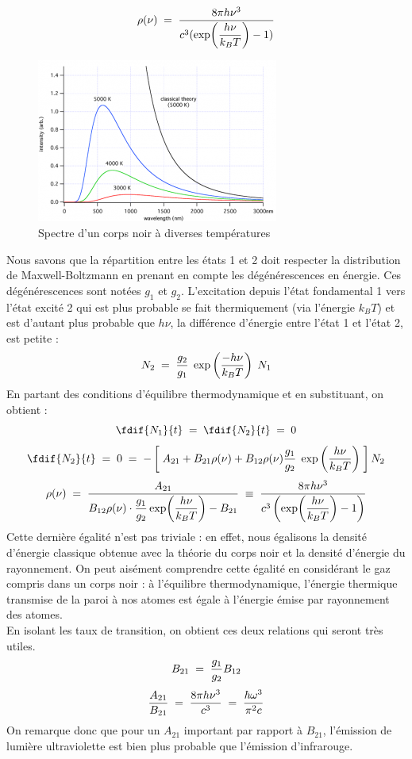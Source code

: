 \begin{equation}
    \rho(\nu) \; = \; \dfrac{8\pi h \nu^3}{c^3(\exp(\dfrac{h\nu}{k_BT})-1)}
\end{equation}
\begin{figure}[htp]
    \centering
    \includegraphics[scale=1.1]{Images2/corps_noir.png}
    \caption{Spectre d'un corps noir à diverses températures}
    \label{fig : Corps noir}
\end{figure}
Nous savons que la répartition entre les états 1 et 2 doit respecter la distribution de Maxwell-Boltzmann en prenant en compte les dégénérescences en énergie. Ces dégénérescences sont notées $g_1$ et $g_2$. L'excitation depuis l'état fondamental 1 vers l'état excité 2 qui est plus probable se fait thermiquement (via l'énergie $k_BT$) et est d'autant plus probable que $h\nu$, la différence d'énergie entre l'état 1 et l'état 2, est petite :
\[
    N_2 \; = \; \dfrac{g_2}{g_1} \; \exp\left(\dfrac{-h\nu}{k_BT}\right) \;N_1
\]
En partant des conditions d'équilibre thermodynamique et en substituant, on obtient :
\[
    \fdif{N_1}{t} \eq \fdif{N_2}{t} \eq 0
\]
\[
    \fdif{N_2}{t}
    \eq 0
    \eq - \left[\;A_{21} + B_{21} \rho(\nu) + B_{12}\rho(\nu) \dfrac{g_1}{g_2} \; \exp\left(\dfrac{h\nu}{k_BT}\right) \;\right] N_2
\]
\[
    \rho(\nu)
    \; = \; \dfrac{A_{21}}{B_{12}\rho(\nu) \cdot \dfrac{g_1}{g_2} \exp(\dfrac{h\nu}{k_BT}) - B_{21}}
    \;\equiv\; \dfrac{8\pi h \nu^3}{c^3\left(\exp(\dfrac{h\nu}{k_BT})-1\right)}
\]
Cette dernière égalité n'est pas triviale : en effet, nous égalisons la densité d'énergie classique obtenue avec la théorie du corps noir et la densité d'énergie du rayonnement. On peut aisément comprendre cette égalité en considérant le gaz compris dans un corps noir : à l'équilibre thermodynamique, l'énergie thermique transmise de la paroi à nos atomes est égale à l'énergie émise par rayonnement des atomes.\\
En isolant les taux de transition, on obtient ces deux relations qui seront très utiles.
\begin{equation}
    B_{21} \; = \; \dfrac{g_1}{g_2}B_{12}
    \label{eq:equilire1}
\end{equation}
\begin{equation}
    \dfrac{A_{21}}{B_{21}}
    \; = \; \dfrac{8\pi h \nu^3}{c^3}
    \; = \; \dfrac{\hbar \omega^3}{\pi^2c}
    \label{eq:equilire2}
\end{equation}
On remarque donc que pour un $A_{21}$ important par rapport à $B_{21}$, l'émission de lumière ultraviolette est bien plus probable que l'émission d'infrarouge.


